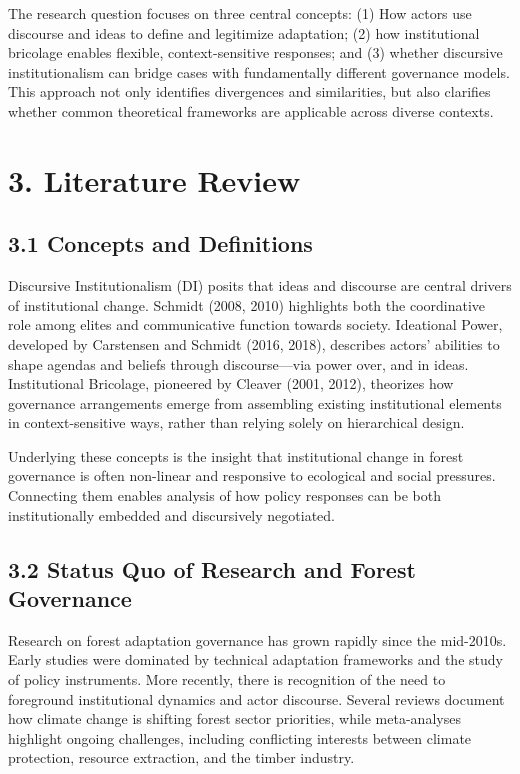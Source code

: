 The research question focuses on three central concepts: (1) How actors use discourse and ideas to define and legitimize adaptation; (2) how institutional bricolage enables flexible, context-sensitive responses; and (3) whether discursive institutionalism can bridge cases with fundamentally different governance models. This approach not only identifies divergences and similarities, but also clarifies whether common theoretical frameworks are applicable across diverse contexts.

\section*{3. Literature Review}

\subsection*{3.1 Concepts and Definitions}

Discursive Institutionalism (DI) posits that ideas and discourse are central drivers of institutional change. Schmidt (2008, 2010) highlights both the coordinative role among elites and communicative function towards society. Ideational Power, developed by Carstensen and Schmidt (2016, 2018), describes actors' abilities to shape agendas and beliefs through discourse---via power over, and in ideas. Institutional Bricolage, pioneered by Cleaver (2001, 2012), theorizes how governance arrangements emerge from assembling existing institutional elements in context-sensitive ways, rather than relying solely on hierarchical design.

Underlying these concepts is the insight that institutional change in forest governance is often non-linear and responsive to ecological and social pressures. Connecting them enables analysis of how policy responses can be both institutionally embedded and discursively negotiated.

\subsection*{3.2 Status Quo of Research and Forest Governance}

Research on forest adaptation governance has grown rapidly since the mid-2010s. Early studies were dominated by technical adaptation frameworks and the study of policy instruments. More recently, there is recognition of the need to foreground institutional dynamics and actor discourse. Several reviews document how climate change is shifting forest sector priorities, while meta-analyses highlight ongoing challenges, including conflicting interests between climate protection, resource extraction, and the timber industry.

